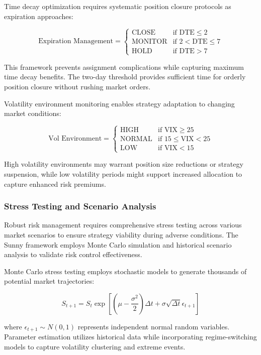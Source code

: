 \documentclass[
  american,
  11pt,
  11pt,
  letterpaper,
  onecolumn]{article}
\begin{document}
Time decay optimization requires systematic position closure protocols
as expiration approaches:

\[\text{Expiration Management} = \begin{cases}
\text{CLOSE} & \text{if } \text{DTE} \leq 2 \\
\text{MONITOR} & \text{if } 2 < \text{DTE} \leq 7 \\
\text{HOLD} & \text{if } \text{DTE} > 7
\end{cases}\]

This framework prevents assignment complications while capturing maximum
time decay benefits. The two-day threshold provides sufficient time for
orderly position closure without rushing market orders.

Volatility environment monitoring enables strategy adaptation to
changing market conditions:

\[\text{Vol Environment} = \begin{cases}
\text{HIGH} & \text{if } \text{VIX} \geq 25 \\
\text{NORMAL} & \text{if } 15 \leq \text{VIX} < 25 \\
\text{LOW} & \text{if } \text{VIX} < 15
\end{cases}\]

High volatility environments may warrant position size reductions or
strategy suspension, while low volatility periods might support
increased allocation to capture enhanced risk premiums.

\subsubsection{Stress Testing and Scenario
Analysis}\label{stress-testing-and-scenario-analysis}

Robust risk management requires comprehensive stress testing across
various market scenarios to ensure strategy viability during adverse
conditions. The Sunny framework employs Monte Carlo simulation and
historical scenario analysis to validate risk control effectiveness.

Monte Carlo stress testing employs stochastic models to generate
thousands of potential market trajectories:

\[S_{t+1} = S_t \exp\left[\left(\mu - \frac{\sigma^2}{2}\right)\Delta t + \sigma\sqrt{\Delta t}\epsilon_{t+1}\right]\]

where \(\epsilon_{t+1} \sim N(0,1)\) represents independent normal
random variables. Parameter estimation utilizes historical data while
incorporating regime-switching models to capture volatility clustering
and extreme events.
\end{document}

